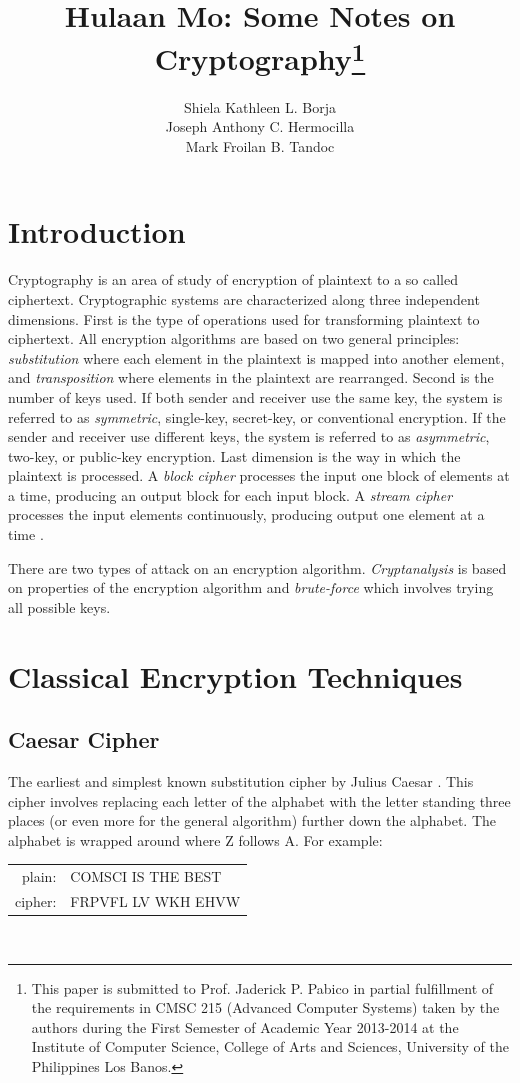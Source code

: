 \documentclass{article}
\title{Hulaan Mo: Some Notes on Cryptography\footnote{This paper is submitted to Prof. Jaderick P. Pabico in partial fulfillment of the requirements in CMSC 215 (Advanced Computer Systems) taken  by the authors during the First Semester of Academic Year 2013-2014 at the Institute of Computer Science, College of Arts and Sciences, University of the Philippines Los Banos.}}
\author{Shiela Kathleen L. Borja\\Joseph Anthony C. Hermocilla\\Mark Froilan B. Tandoc}
\date{}
\begin{document}
\maketitle

\section{Introduction}
Cryptography is an area of study of encryption of plaintext to a so called ciphertext. Cryptographic systems are characterized along three independent dimensions. First is the type of operations used for transforming plaintext to ciphertext. All encryption algorithms are based on two general principles: \textit{substitution} where each element in the plaintext is mapped into another element, and \textit{transposition} where elements in the plaintext are rearranged. Second is the number of keys used. If both sender and receiver use the same key, the system is referred to as \textit{symmetric}, single-key, secret-key, or conventional encryption. If the sender and receiver use different keys, the system is referred to as \textit{asymmetric}, two-key, or public-key encryption. Last dimension is the way in which the plaintext is processed. A \textit{block cipher} processes the input one block of elements at a time, producing an output block for each input block. A \textit{stream cipher} processes the input elements continuously, producing output one element at a time \cite{stallings2011}.

There are two types of attack on an encryption algorithm. \textit{Cryptanalysis} is based on properties of the encryption algorithm and \textit{brute-force} which involves trying all possible keys.

\section{Classical Encryption Techniques}
\subsection{Caesar Cipher}
The earliest and simplest known substitution cipher by Julius Caesar \cite{stallings2011}. This cipher involves replacing each letter of the alphabet with the letter standing three places (or even more for the general algorithm) further down the alphabet. The alphabet is wrapped around where Z follows A. For example:
\\

\begin{tabular}{r l}
	plain: & COMSCI IS THE BEST\\
	cipher: & FRPVFL LV WKH EHVW
\end{tabular}
\\
\end{document}
